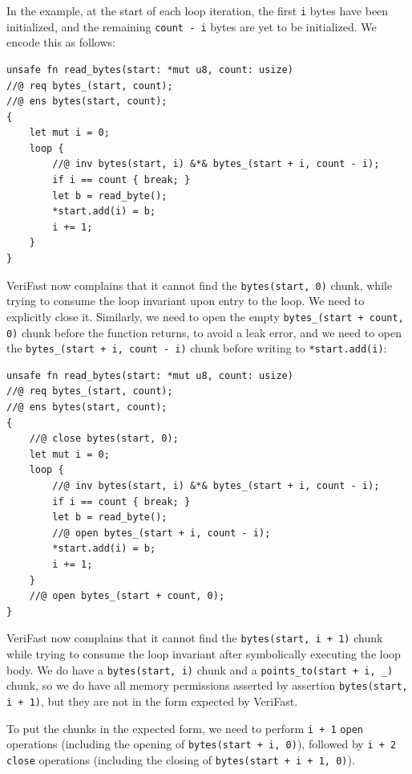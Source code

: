 \documentclass{article}
\begin{document}
In the example, at the start of each loop iteration, the first \lstinline|i| bytes have been initialized, and the remaining \lstinline|count - i| bytes are yet to be initialized. We encode this as follows:
\begin{lstlisting}
unsafe fn read_bytes(start: *mut u8, count: usize)
//@ req bytes_(start, count);
//@ ens bytes(start, count);
{
    let mut i = 0;
    loop {
        //@ inv bytes(start, i) &*& bytes_(start + i, count - i);
        if i == count { break; }
        let b = read_byte();
        *start.add(i) = b;
        i += 1;
    }
}
\end{lstlisting}
VeriFast now complains that it cannot find the \lstinline|bytes(start, 0)| chunk, while trying to consume the loop invariant upon entry to the loop. We need to explicitly close it. Similarly, we need to open the empty \lstinline|bytes_(start + count, 0)| chunk before the function returns, to avoid a leak error, and we need to open the \lstinline|bytes_(start + i, count - i)| chunk before writing to \lstinline|*start.add(i)|:
\begin{lstlisting}
unsafe fn read_bytes(start: *mut u8, count: usize)
//@ req bytes_(start, count);
//@ ens bytes(start, count);
{
    //@ close bytes(start, 0);
    let mut i = 0;
    loop {
        //@ inv bytes(start, i) &*& bytes_(start + i, count - i);
        if i == count { break; }
        let b = read_byte();
        //@ open bytes_(start + i, count - i);
        *start.add(i) = b;
        i += 1;
    }
    //@ open bytes_(start + count, 0);
}
\end{lstlisting}
VeriFast now complains that it cannot find the \lstinline|bytes(start, i + 1)| chunk while trying to consume the loop invariant after symbolically executing the loop body. We do have a \lstinline|bytes(start, i)| chunk and a \lstinline|points_to(start + i, _)| chunk, so we do have all memory permissions asserted by assertion \lstinline|bytes(start, i + 1)|, but they are not in the form expected by VeriFast.

To put the chunks in the expected form, we need to perform \lstinline|i + 1| \lstinline|open| operations (including the opening of \lstinline|bytes(start + i, 0)|), followed by \lstinline|i + 2| \lstinline|close| operations (including the closing of \lstinline|bytes(start + i + 1, 0)|). 
\end{document}
